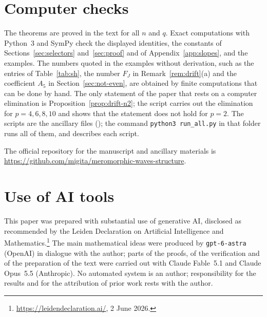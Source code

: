 \documentclass[11pt]{article}
\theoremstyle{definition}
\theoremstyle{remark}
\numberwithin{equation}{section}
\begin{document}
\section{Computer checks}\label{app:computations}

The theorems are proved in the text for all \(n\) and \(q\). Exact
computations with Python~3 and SymPy check the displayed identities,
the constants of Sections~\ref{sec:selectors} and~\ref{sec:proof} and
of Appendix~\ref{app:slopes}, and the examples. The numbers quoted in
the examples without derivation, such as the entries of
Table~\ref{tab:sh}, the number \(F_J\) in Remark~\ref{rem:drift}(a) and
the coefficient \(A_5\) in Section~\ref{sec:not-even}, are obtained by
finite computations that can be done by hand. The only statement of the
paper that rests on a computer elimination is
Proposition~\ref{prop:drift-n2}; the script
\mbox{} carries out the elimination for
\(p=4,6,8,10\) and shows that the statement does not hold for \(p=2\). The
scripts are the ancillary files (); the command
\texttt{python3 run\_all.py} in that folder runs all of them, and
 describes each script.

The official repository for the manuscript and ancillary materials is
\url{https://github.com/migita/meromorphic-waves-structure}.

\section*{Use of AI tools}

{\small
This paper was prepared with substantial use of generative AI, disclosed
as recommended by the Leiden Declaration on Artificial Intelligence and
Mathematics.\footnote{\url{https://leidendeclaration.ai/}, 2 June 2026.}
The main mathematical ideas were produced by \texttt{gpt-6-astra}
(OpenAI) in dialogue with the author; parts of the proofs, of the
verification and of the preparation of the text were carried out with
Claude Fable~5.1 and Claude Opus~5.5 (Anthropic). No automated system
is an author; responsibility for the results and for the attribution of
prior work rests with the author.\par}

\begingroup
\raggedright


\endgroup
\end{document}
